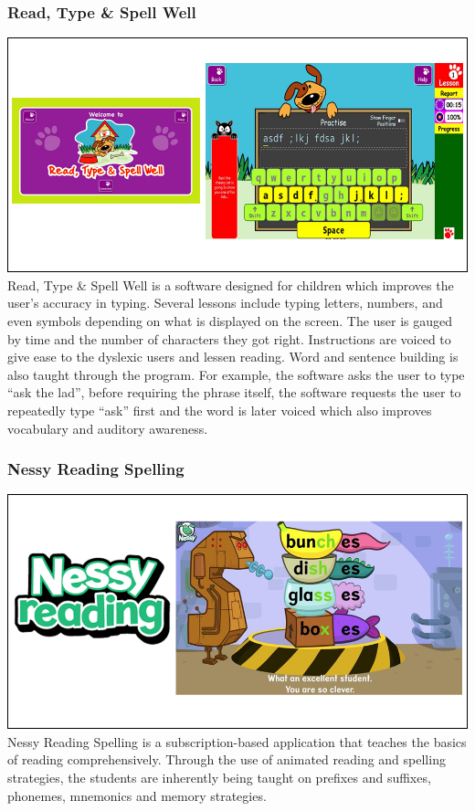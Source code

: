 \documentclass[letterpaper, 12pt, oneside]{book}
\begin{document}
\subsubsection{Read, Type \& Spell Well}
\includegraphics[width=\textwidth]{rwsw}
\newline
Read, Type \& Spell Well is a software designed for children which improves the user’s accuracy in typing. Several lessons include typing letters, numbers, and even symbols depending on what is displayed on the screen. The user is gauged by time and the number of characters they got right. Instructions are voiced to give ease to the dyslexic users and lessen reading. Word and sentence building is also taught through the program. For example, the software asks the user to type “ask the lad”, before requiring the phrase itself, the software requests the user to repeatedly type “ask” first and the word is later voiced which also improves vocabulary and auditory awareness.

\subsubsection{Nessy Reading Spelling}
\includegraphics[width=\textwidth]{nesssy}
\newline
Nessy Reading Spelling is a subscription-based application that teaches the basics of reading comprehensively. Through the use of animated reading and spelling strategies, the students are inherently being taught on prefixes and suffixes, phonemes, mnemonics and memory strategies.
\end{document}
